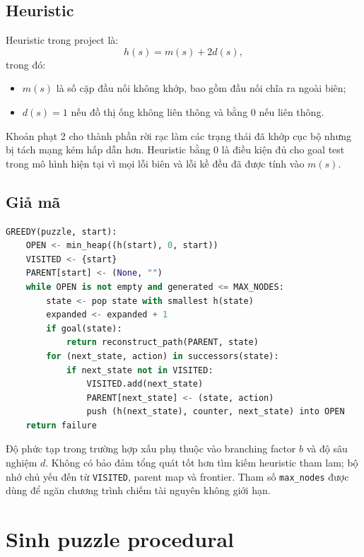 \documentclass[12pt,a4paper]{article}
\newcommand{\code}[1]{\texttt{#1}}
\begin{document}
\subsection{Heuristic}
Heuristic trong project là:
\begin{equation}
  h(s)=m(s)+2d(s),
\end{equation}
trong đó:
\begin{itemize}
  \item \(m(s)\) là số cặp đầu nối không khớp, bao gồm đầu nối chĩa ra ngoài biên;
  \item \(d(s)=1\) nếu đồ thị ống không liên thông và bằng 0 nếu liên thông.
\end{itemize}
Khoản phạt 2 cho thành phần rời rạc làm các trạng thái đã khớp cục bộ nhưng bị tách mạng kém hấp dẫn hơn. Heuristic bằng 0 là điều kiện đủ cho goal test trong mô hình hiện tại vì mọi lỗi biên và lỗi kề đều đã được tính vào \(m(s)\).

\subsection{Giả mã}
\begin{lstlisting}[language=Python,caption={Giả mã Greedy Best-First Search}]
GREEDY(puzzle, start):
    OPEN <- min_heap((h(start), 0, start))
    VISITED <- {start}
    PARENT[start] <- (None, "")
    while OPEN is not empty and generated <= MAX_NODES:
        state <- pop state with smallest h(state)
        expanded <- expanded + 1
        if goal(state):
            return reconstruct_path(PARENT, state)
        for (next_state, action) in successors(state):
            if next_state not in VISITED:
                VISITED.add(next_state)
                PARENT[next_state] <- (state, action)
                push (h(next_state), counter, next_state) into OPEN
    return failure
\end{lstlisting}

Độ phức tạp trong trường hợp xấu phụ thuộc vào branching factor \(b\) và độ sâu nghiệm \(d\). Không có bảo đảm tổng quát tốt hơn tìm kiếm heuristic tham lam; bộ nhớ chủ yếu đến từ \code{VISITED}, parent map và frontier. Tham số \code{max\_nodes} được dùng để ngăn chương trình chiếm tài nguyên không giới hạn.

\section{Sinh puzzle procedural}
\end{document}
